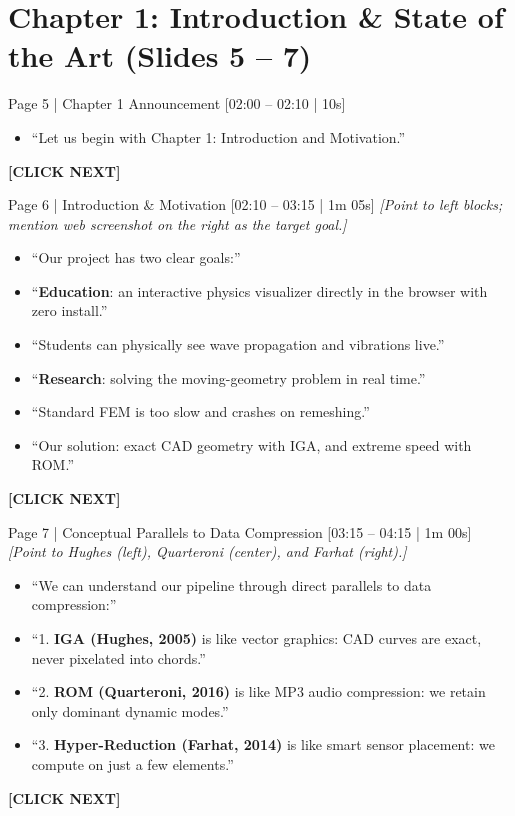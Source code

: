 \documentclass[9pt,a4paper]{article}
\begin{document}
\section*{Chapter 1: Introduction \& State of the Art (Slides 5 -- 7)}

\begin{slidebox}{Page 5 | Chapter 1 Announcement \hfill [02:00 -- 02:10 | 10s]}
\begin{itemize}
  \item ``Let us begin with Chapter 1: Introduction and Motivation.''
\end{itemize}
\textbf{\color{cnamred}[CLICK NEXT]}
\end{slidebox}

\begin{slidebox}{Page 6 | Introduction \& Motivation \hfill [02:10 -- 03:15 | 1m 05s]}
\textit{[Point to left blocks; mention web screenshot on the right as the target goal.]}
\begin{itemize}
  \item ``Our project has two clear goals:''
  \item ``\textbf{Education}: an interactive physics visualizer directly in the browser with zero install.''
  \item ``Students can physically see wave propagation and vibrations live.''
  \item ``\textbf{Research}: solving the moving-geometry problem in real time.''
  \item ``Standard FEM is too slow and crashes on remeshing.''
  \item ``Our solution: exact CAD geometry with IGA, and extreme speed with ROM.''
\end{itemize}
\textbf{\color{cnamred}[CLICK NEXT]}
\end{slidebox}

\begin{slidebox}{Page 7 | Conceptual Parallels to Data Compression \hfill [03:15 -- 04:15 | 1m 00s]}
\textit{[Point to Hughes (left), Quarteroni (center), and Farhat (right).]}
\begin{itemize}
  \item ``We can understand our pipeline through direct parallels to data compression:''
  \item ``1. \textbf{IGA (Hughes, 2005)} is like vector graphics: CAD curves are exact, never pixelated into chords.''
  \item ``2. \textbf{ROM (Quarteroni, 2016)} is like MP3 audio compression: we retain only dominant dynamic modes.''
  \item ``3. \textbf{Hyper-Reduction (Farhat, 2014)} is like smart sensor placement: we compute on just a few elements.''
\end{itemize}
\textbf{\color{cnamred}[CLICK NEXT]}
\end{slidebox}
\end{document}
